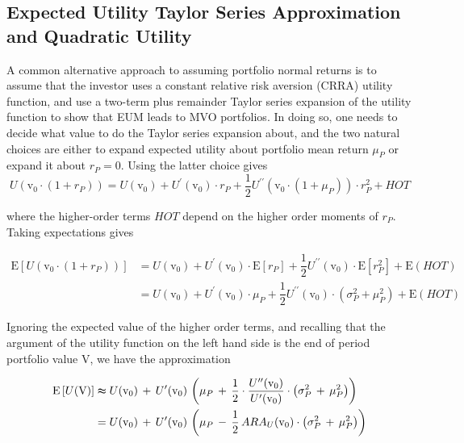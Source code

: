 \documentclass[graybox,envcountchap,sectrefs]{svmono}\usepackage[]{graphicx}\usepackage[]{xcolor}
\begin{document}
\begin{appendices}
\subsection*{Expected Utility Taylor Series Approximation and Quadratic Utility }

A common alternative approach to assuming portfolio normal returns
is to assume that the investor uses a constant relative risk aversion
(CRRA) utility function, and use a two-term plus remainder Taylor
series expansion of the utility function to show that EUM leads to
MVO portfolios. In doing so, one needs to decide what value to do
the Taylor series expansion about, and the two natural choices are
either to expand expected utility about portfolio mean return $\mu_{P}$
or expand it about $r_{P}=0$. Using the latter choice gives
\begin{equation}
U(\mathrm{v}_{0}\cdot(1+\mathit{r_{P}}))=U(\mathrm{v}_{0})+U^{\prime}(\mathrm{v}_{0})\cdot r_{P}+\dfrac{1}{2}U^{\prime\prime}(\mathrm{v}_{0}\cdot(1+\mathit{\mu_{P}}))\cdot r_{P}^{2}+HOT\label{eq: utilityTaylorSeries}
\end{equation}

where the higher-order terms $HOT$ depend on the higher order moments
of $r_{P}$. Taking expectations gives

\begin{align}
\mathrm{E}\left[U(\mathrm{v}_{0}\cdot(1+\mathit{r_{P}}))\right] & =U(\mathrm{v}_{0})+U^{\prime}(\mathrm{v}_{0})\cdot\mathrm{E}\left[r_{P}\right]+\dfrac{1}{2}U^{\prime\prime}(\mathrm{v}_{0})\cdot\mathrm{E}\left[r_{P}^{2}\right]+\mathrm{E}\left(HOT\right)\nonumber \\
 & =U(\mathrm{v}_{0})+U^{\prime}(\mathrm{v}_{0})\cdot\mu_{P}+\dfrac{1}{2}U^{\prime\prime}(\mathrm{v}_{0})\cdot\left(\sigma_{P}^{2}+\mu_{P}^{2}\right)+\mathrm{E}\left(HOT\right)\label{eq: expectedUtilityTaylorWithHOT}
\end{align}

Ignoring the expected value of the higher order terms, and recalling
that the argument of the utility function on the left hand side is
the end of period portfolio value $\mathrm{V}$, we have the approximation

\begin{align}
\mathrm{E}\left[U(\mathrm{V})\right] & \thickapprox U(\mathrm{v}_{0})\,+\,U^{\prime}(\mathrm{v}_{0})\,\left(\mu_{P}\,+\,\dfrac{1}{2}\cdot\dfrac{U^{\prime\prime}(\mathrm{v}_{0})}{U^{\prime}(\mathrm{v}_{0})}\cdot\left(\sigma_{P}^{2}\,+\,\mu_{P}^{2}\right)\right)\nonumber \\
 & =U(\mathrm{v}_{0})\,+\,U^{\prime}(\mathrm{v}_{0})\,\left(\mu_{P}\,-\,\dfrac{1}{2}\,ARA_{U}(\mathrm{v}_{0})\cdot\left(\sigma_{P}^{2}\,+\,\mu_{P}^{2}\right)\right)\label{eq: equivalentExpectedUtilityAroundZeroApprox}
\end{align}


\end{appendices}
\end{document}
